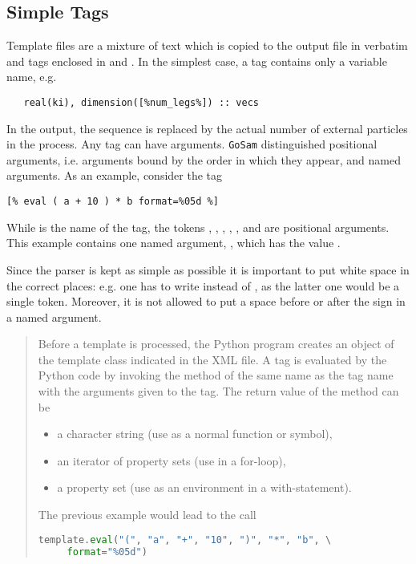 \documentclass[11pt,a4paper]{refrep}
\newcommand{\golem}{{\tt GoSam}\xspace}
\begin{document}
\subsection{Simple Tags}
Template files are a mixture of text which is copied to the output file in
verbatim and tags enclosed in \lit{[\%} and \lit{\%]}. In the simplest
case, a tag contains only a variable name, e.g.
\begin{lstlisting}
   real(ki), dimension([%num_legs%]) :: vecs
\end{lstlisting}
In the output, the sequence  is replaced by the
actual number of external particles in the process.
Any tag can have arguments. \golem{} distinguished positional arguments,
i.e. arguments bound by the order in which they appear, and named
arguments. As an example, consider the tag
\begin{lstlisting}
[% eval ( a + 10 ) * b format=%05d %]
\end{lstlisting}
While  is the name of the tag, the tokens
\lit{(}, , \lit{+}, , \lit{)}, \lit{*} and 
are positional arguments. This example contains one named argument,
, which has the value .

\attention{} Since the parser is
kept as simple as possible it is important to put white space in
the correct places: e.g. one has to write  instead of
, as the latter one would be a single token. Moreover,
it is not allowed to put a space before or after the \lit{=} sign
in a named argument.

\begin{quotation}
\small\sf
Before a template is processed, the Python program creates an
object of the template class indicated in the XML file.
A tag is evaluated by the Python code by invoking the method
of the same name as the tag name with the arguments given to the tag.
The return value of the method can be
\begin{itemize}
\item a character string (use as a normal function or symbol),
\item an iterator of property sets (use in a for-loop),
\item a property set (use as an environment in a with-statement).
\end{itemize}
The previous example would lead to the call
\begin{lstlisting}[language=Python]
template.eval("(", "a", "+", "10", ")", "*", "b", \
     format="%05d")
\end{lstlisting}
\end{quotation}
\end{document}
